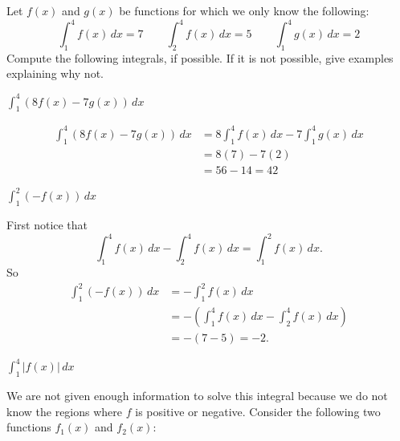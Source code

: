 \documentclass[handout, nooutcomes]{ximera}
\renewenvironment{freeResponse}{
\ifhandout\setbox0\vbox\bgroup\else
\begin{trivlist}\item[\hskip \labelsep\bfseries Solution:\hspace{2ex}]
\fi}
{\ifhandout\egroup\else
\end{trivlist}
\fi}
\renewcommand{\d}{\,d}
\begin{document}
\begin{problem}
Let $f(x)$ and $g(x)$ be functions for which we only know the following:
$$ \int_1^4 f(x)\d x = 7	\qquad	\int_2^4 f(x)\d x = 5	\qquad	\int_1^4 g(x)\d x = 2 $$
Compute the following integrals, if possible.  If it is not possible, give examples explaining why not.
	\begin{enumerate}
	
	\item  $\int_1^4 (8f(x) - 7g(x))\d x $
		\begin{freeResponse}
			\begin{align*}
			\int_1^4 (8f(x) - 7g(x))\d x &= 8 \int_1^4 f(x) \d x - 7 \int_1^4 g(x) \d x  \\
			&= 8(7) - 7(2) \\
			&= 56 - 14 = 42
			\end{align*}
		\end{freeResponse}
		
		
		
	\item  $\int_1^2 (-f(x)) \d x $
		\begin{freeResponse}
		First notice that
			\begin{equation*}
			\int_1^4 f(x) \d x - \int_2^4 f(x) \d x = \int_1^2 f(x) \d x.
			\end{equation*}
		So
			\begin{align*}
			\int_1^2 (-f(x)) \d x &= - \int_1^2 f(x) \d x  \\
			&= - \left( \int_1^4 f(x)\d x - \int_2^4 f(x)\d x \right)  \\
			&= - (7 - 5) = -2.
			\end{align*}
			
		\end{freeResponse}
		
		
		
	\item  $\int_1^4 \left| f(x) \right| \d x$
		\begin{freeResponse}
		We are not given enough information to solve this integral because we do not know the regions where $f$ is positive or negative.
		Consider the following two functions $f_1(x)$ and $f_2(x)$:  
		

\end{freeResponse}
\end{enumerate}
\end{problem}
\end{document}
